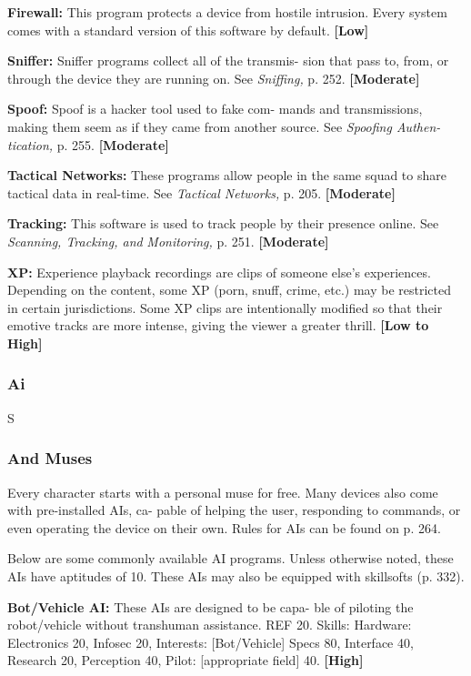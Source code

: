 \textbf{Firewall:} This program protects a device from 
hostile intrusion. Every system comes with a standard 
version of this software by default. \textbf{[Low]}

\textbf{Sniffer:} Sniffer programs collect all of the transmis-
sion that pass to, from, or through the device they are 
running on. See \textit{Sniffing,} p. 252. \textbf{[Moderate]}

\textbf{Spoof:} Spoof is a hacker tool used to fake com-
mands and transmissions, making them seem as if 
they came from another source. See \textit{Spoofing Authen-}
\textit{tication,} p. 255. \textbf{[Moderate]}

\textbf{Tactical Networks:} These programs allow people in 
the same squad to share tactical data in real-time. See 
\textit{Tactical Networks,} p. 205. \textbf{[Moderate]}

\textbf{Tracking:} This software is used to track people by 
their presence online. See \textit{Scanning, Tracking, and }
\textit{Monitoring,} p. 251. \textbf{[Moderate]}

\textbf{XP:} Experience playback recordings are clips of 
someone else's experiences. Depending on the content, 
some XP (porn, snuff, crime, etc.) may be restricted in 
certain jurisdictions. Some XP clips are intentionally 
modified so that their emotive tracks are more intense, 
giving the viewer a greater thrill. \textbf{[Low to High]}

\subsubsection{Ai}


S

\subsubsection{ And Muses}

Every character starts with a personal muse for free. 
Many devices also come with pre-installed AIs, ca-
pable of helping the user, responding to commands, or 
even operating the device on their own. Rules for AIs 
can be found on p. 264.

Below are some commonly available AI programs. 
Unless otherwise noted, these AIs have aptitudes of 10. 
These AIs may also be equipped with skillsofts (p. 332).

\textbf{Bot/Vehicle AI:} These AIs are designed to be capa-
ble of piloting the robot/vehicle without transhuman 
assistance. REF 20. Skills: Hardware: Electronics 20, 
Infosec 20, Interests: [Bot/Vehicle] Specs 80, Interface 
40, Research 20, Perception 40, Pilot: [appropriate 
field] 40. \textbf{[High]}

